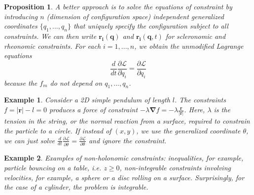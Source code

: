 \documentclass[a4paper]{article}
\newtheorem{eg}{Example}[section]
\theoremstyle{new}
\newtheorem{prop}{Proposition}[section]
\begin{document}
\begin{prop}
A better approach is to solve the equations of constraint by introducing $n$ (dimension of configuration space) independent generalized coordinates $\{q_1,...,q_n\}$ that uniquely specify the configuration subject to all constraints. We can then write $\mathbf{r_i}(\mathbf{q})$ and $\mathbf{r_i}(\mathbf{q},t)$ for scleronomic and rheonomic constraints. For each $i=1,...,n$, we obtain the unmodified Lagrange equations
$$\frac{d}{dt}\frac{\partial\mathcal{L}}{\partial\dot{q}_i}=\frac{\partial\mathcal{L}}{\partial q_i}$$
because the $f_m$ do not depend on $q_1,...,q_n$.
\end{prop}
\begin{eg}
Consider a 2D simple pendulum of length $l$. The constraints $f=|\mathbf{r}|-l=0$ produces a force of constraint $-\lambda\boldsymbol{\nabla}f=-\lambda\frac{\mathbf{r}}{|\mathbf{r}|}$. Here, $\lambda$ is the tension in the string, or the normal reaction from a surface, required to constrain the particle to a circle. If instead of $(x,y)$, we use the generalized coordinate $\theta$, we can just solve $\frac{d}{dt}\frac{\partial\mathcal{L}}{\partial\dot{\theta}}=\frac{\partial\mathcal{L}}{\partial\theta}$ and ignore the constraint.
\end{eg}
\begin{eg}
Examples of non-holonomic constraints: inequalities, for example, particle bouncing on a table, i.e. $z\geq0$, non-integrable constraints involving velocities, for example, a sphere or a disc rolling on a surface. Surprisingly, for the case of a cylinder, the problem is integrable.
\end{eg}
\end{document}
